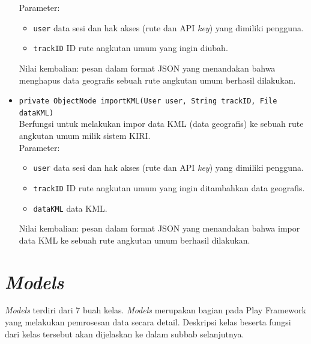 \begin{itemize}
	Parameter:
	\begin{itemize}
		\item \texttt{user} data sesi dan hak akses (rute dan API \textit{key}) yang dimiliki pengguna.
		\item \texttt{trackID} ID rute angkutan umum yang ingin diubah.
	\end{itemize}
	Nilai kembalian: pesan dalam format JSON yang menandakan bahwa menghapus data geografis sebuah rute angkutan umum berhasil dilakukan.
	\item \texttt{private ObjectNode importKML(User user, String trackID, File dataKML)}\\
	Berfungsi untuk melakukan impor data KML (data geografis) ke sebuah rute angkutan umum milik sistem KIRI.\\
	Parameter:
	\begin{itemize}
		\item \texttt{user} data sesi dan hak akses (rute dan API \textit{key}) yang dimiliki pengguna.
		\item \texttt{trackID} ID rute angkutan umum yang ingin ditambahkan data geografis.
		\item \texttt{dataKML} data KML.
	\end{itemize}
	Nilai kembalian: pesan dalam format JSON yang menandakan bahwa impor data KML ke sebuah rute angkutan umum berhasil dilakukan.
\end{itemize}

\section{\textit{Models}}
\label{sec:modelsrancangan}
\textit{Models} terdiri dari 7 buah kelas. \textit{Models} merupakan bagian pada Play Framework yang melakukan pemrosesan data secara detail. Deskripsi kelas beserta fungsi dari kelas tersebut akan dijelaskan ke dalam subbab selanjutnya.


